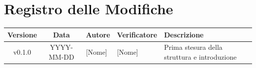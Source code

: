 \section*{Registro delle Modifiche}
\begin{table}[ht]
	\centering
	\renewcommand{\arraystretch}{1.5}
	\begin{tabularx}{\textwidth}{c c l l X}
		\toprule
		\textbf{Versione} & \textbf{Data} & \textbf{Autore} & \textbf{Verificatore} & \textbf{Descrizione} \\
		\midrule
		v0.1.0 & YYYY-MM-DD & {[Nome]} & {[Nome]} & Prima stesura della struttura e introduzione \\
		\bottomrule
	\end{tabularx}
\end{table}